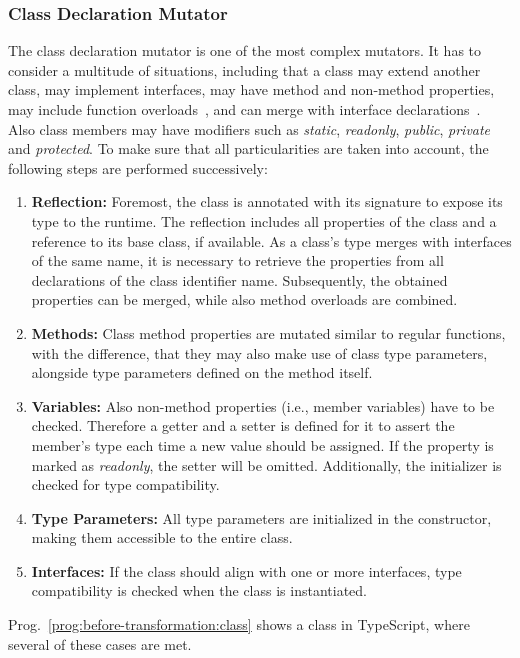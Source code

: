 \subsubsection{Class Declaration Mutator}

The class declaration mutator is one of the most complex mutators. It has to consider a multitude of situations, including that a class may extend another class, may implement interfaces, may have method and non-method properties, may include function overloads~\cite{TypeScriptHandbook:Functions}, and can merge with interface declarations~\cite{TypeScriptHandbook:DeclarationMerging}. Also class members may have modifiers such as \emph{static}, \emph{readonly}, \emph{public}, \emph{private} and \emph{protected}. To make sure that all particularities are taken into account, the following steps are performed successively:
\begin{enumerate}
  \item \textbf{Reflection:} Foremost, the class is annotated with its signature to expose its type to the runtime. The reflection includes all properties of the class and a reference to its base class, if available. As a class's type merges with interfaces of the same name, it is necessary to retrieve the properties from all declarations of the class identifier name. Subsequently, the obtained properties can be merged, while also method overloads are combined.
  \item \textbf{Methods:} Class method properties are mutated similar to regular functions, with the difference, that they may also make use of class type parameters, alongside type parameters defined on the method itself.
  \item \textbf{Variables:} Also non-method properties (i.e., member variables) have to be checked. Therefore a getter and a setter is defined for it to assert the member's type each time a new value should be assigned. If the property is marked as \emph{readonly}, the setter will be omitted. Additionally, the initializer is checked for type compatibility.
  \item \textbf{Type Parameters:} All type parameters are initialized in the constructor, making them accessible to the entire class.
  \item \textbf{Interfaces:} If the class should align with one or more interfaces, type compatibility is checked when the class is instantiated.
\end{enumerate}
Prog.~\ref{prog:before-transformation:class} shows a class in TypeScript, where several of these cases are met.
